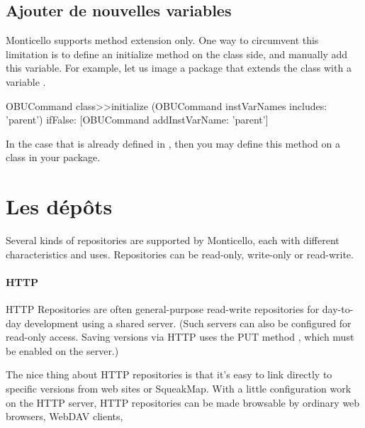 \documentclass[a4paper,10pt,twoside]{book}
\begin{document}
\subsection{Ajouter de nouvelles variables} %

Monticello supports method extension only. One way to circumvent this limitation is to define an initialize method on the class side, and manually add this variable. For example, let us image  a package that extends the class  with a variable .

\begin{code}{}
OBUCommand class>>initialize
	(OBUCommand instVarNames includes: 'parent') 
		ifFalse: [OBUCommand addInstVarName: 'parent']
\end{code}

In the case that  is already defined in , then you may define this  method on a class in your package.


\section{Les d\'ep\^ots} %

Several kinds of repositories are supported by Monticello, each with different characteristics and uses. Repositories can be read-only, write-only or read-write.  

\paragraph{HTTP} HTTP Repositories are often general-purpose read-write repositories for day-to-day  development using a shared server. (Such servers can also be configured for read-only access. Saving versions via HTTP uses the PUT method , which must be enabled on the server.)

The nice thing about HTTP repositories is that it's easy to link directly to specific versions from web sites or SqueakMap. With a little configuration work on the HTTP server, HTTP repositories can be made browsable by ordinary web browsers, WebDAV clients, \etc
{}
\end{document}
